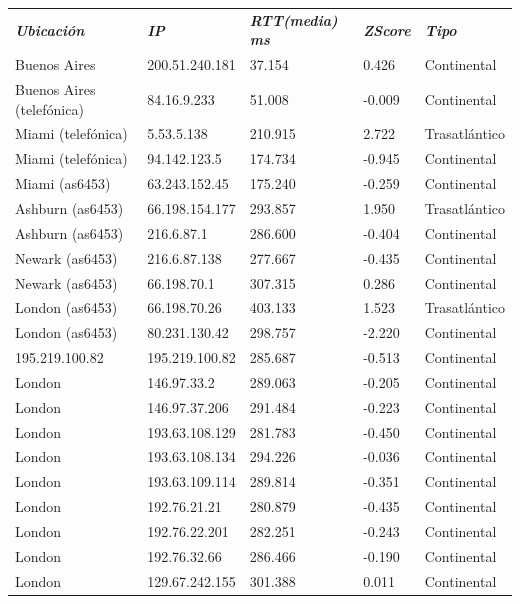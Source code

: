 \begin{tabular}{lllll}
	\textit{\textbf{Ubicaci\'on}}	&	\textit{\textbf{IP}}	&	\textit{\textbf{RTT(media) ms}}	&	\textit{\textbf{ZScore}}	&	\textit{\textbf{Tipo}}	\\	
	Buenos Aires			&	200.51.240.181	&	37.154	&	0.426	&	Continental	\\
	Buenos Aires (telef\'onica)	&	84.16.9.233	&	51.008	&	-0.009	&	Continental	\\
	Miami (telef\'onica)		&	5.53.5.138	&	210.915	&	2.722	&	Trasatl\'antico	\\
	Miami (telef\'onica)		&	94.142.123.5	&	174.734	&	-0.945	&	Continental	\\
	Miami (as6453)			&	63.243.152.45	&	175.240	&	-0.259	&	Continental	\\
	Ashburn (as6453)		&	66.198.154.177	&	293.857	&	1.950	&	Trasatl\'antico	\\
	Ashburn (as6453)		&	216.6.87.1	&	286.600	&	-0.404	&	Continental	\\
	Newark (as6453)			&	216.6.87.138	&	277.667	&	-0.435	&	Continental	\\
	Newark (as6453)			&	66.198.70.1	&	307.315	&	0.286	&	Continental	\\
	London (as6453)			&	66.198.70.26	&	403.133	&	1.523	&	Trasatl\'antico	\\
	London (as6453)			&	80.231.130.42	&	298.757	&	-2.220	&	Continental	\\
	195.219.100.82			&	195.219.100.82	&	285.687	&	-0.513	&	Continental	\\
	London				&	146.97.33.2	&	289.063	&	-0.205	&	Continental	\\
	London				&	146.97.37.206	&	291.484	&	-0.223	&	Continental	\\
	London				&	193.63.108.129	&	281.783	&	-0.450	&	Continental	\\
	London				&	193.63.108.134	&	294.226	&	-0.036	&	Continental	\\
	London				&	193.63.109.114	&	289.814	&	-0.351	&	Continental	\\
	London				&	192.76.21.21	&	280.879	&	-0.435	&	Continental	\\
	London				&	192.76.22.201	&	282.251	&	-0.243	&	Continental	\\
	London				&	192.76.32.66	&	286.466	&	-0.190	&	Continental	\\
	London				&	129.67.242.155	&	301.388	&	0.011	&	Continental	\\

\end{tabular}

